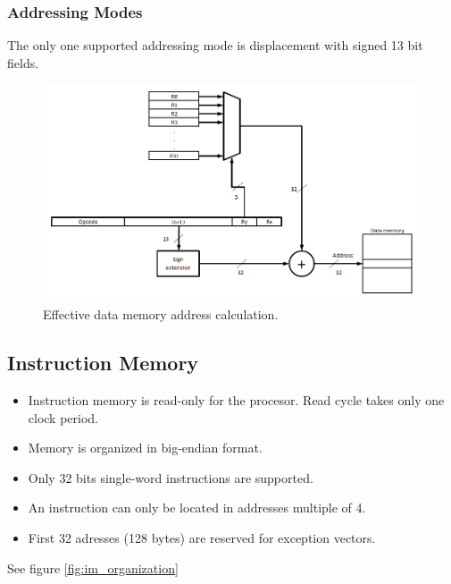 \subsubsection{Addressing Modes}
\label{sssec:addressing_modes}

The only one supported addressing mode is displacement with signed 13 bit fields.

\begin{figure}
\includegraphics[scale=0.6]{./figures/eff_address.png}
\caption{Effective data memory address calculation.}
\end{figure}

\subsection{Instruction Memory}
\label{ssec:instruction_memory}

\begin{itemize}
   \item Instruction memory is read-only for the procesor. Read cycle takes only one clock period.
   \item Memory is organized in big-endian format.
   \item Only 32 bits single-word instructions are supported.
   \item An instruction can only be located in addresses multiple of 4.
   \item First 32 adresses (128 bytes) are reserved for exception vectors.
\end{itemize}
See figure \ref{fig:im_organization}

